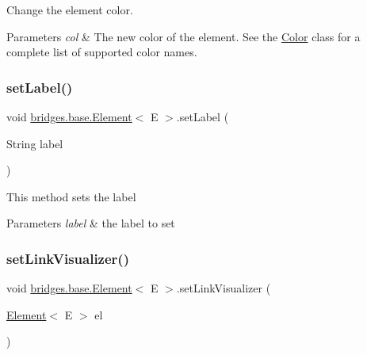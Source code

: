 Change the element color. 


\begin{DoxyParams}{Parameters}
{\em col} & The new color of the element. See the \mbox{\hyperlink{classbridges_1_1base_1_1_color}{Color}} class for a complete list of supported color names. \\
\hline
\end{DoxyParams}
\mbox{\label{classbridges_1_1base_1_1_element_a942ccd766aeca0c4fdbe27ef8cbe78d9}} 
\subsubsection{\texorpdfstring{setLabel()}{setLabel()}}
{\footnotesize\ttfamily void \mbox{\hyperlink{classbridges_1_1base_1_1_element}{bridges.\+base.\+Element}}$<$ E $>$.set\+Label (\begin{DoxyParamCaption}\item[{String}]{label }\end{DoxyParamCaption})}

This method sets the label


\begin{DoxyParams}{Parameters}
{\em label} & the label to set \\
\hline
\end{DoxyParams}
\mbox{\label{classbridges_1_1base_1_1_element_af6251f52b9d277dd77e3bab1829d0197}} 
\subsubsection{\texorpdfstring{setLinkVisualizer()}{setLinkVisualizer()}}
{\footnotesize\ttfamily void \mbox{\hyperlink{classbridges_1_1base_1_1_element}{bridges.\+base.\+Element}}$<$ E $>$.set\+Link\+Visualizer (\begin{DoxyParamCaption}\item[{\mbox{\hyperlink{classbridges_1_1base_1_1_element}{Element}}$<$ E $>$}]{el }\end{DoxyParamCaption})\hspace{0.3cm}{\ttfamily [protected]}}



